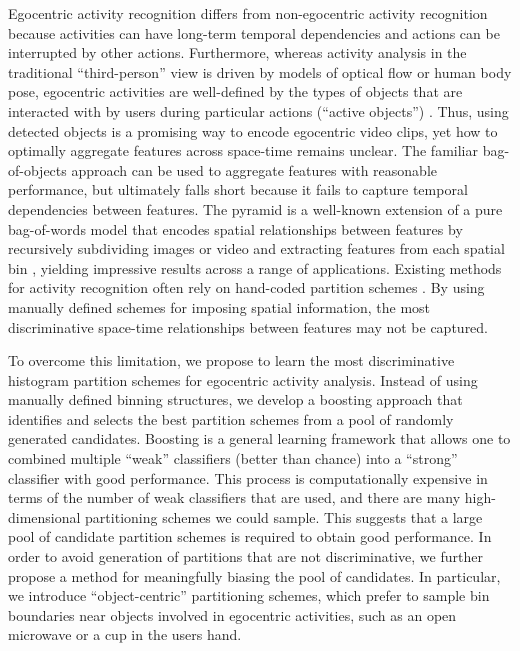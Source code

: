 \documentclass[12pt]{article} %
\begin{document}
   Egocentric activity recognition differs from
  non-egocentric activity recognition because activities can have long-term
  temporal dependencies and actions can be interrupted by other actions. 
  Furthermore, whereas activity analysis in the traditional ``third-person''
  view is driven by models of optical flow or human body pose, egocentric activities
  are well-defined by the types of objects that are interacted with by users
  during particular actions (``active objects'') \cite{Ramanan12}.
  Thus, using detected objects is a promising way to encode egocentric video
  clips, yet how to optimally aggregate
  features across space-time remains unclear.
  The familiar bag-of-objects approach can be used to aggregate 
  features with reasonable performance, but ultimately falls short because it
  fails to capture temporal dependencies between features.
  The pyramid is a well-known extension of a pure bag-of-words model that encodes spatial
  relationships between features by recursively subdividing images or video and extracting 
  features from each spatial bin \cite{Lazebnik06}, yielding impressive
  results across a range of applications.
  Existing methods for activity recognition often rely on
  hand-coded partition schemes \cite{Ramanan12, Choi08, Laptev08}.
  By using manually defined schemes for imposing spatial
  information, the most discriminative space-time relationships between features may not be 
  captured. 







  To overcome this limitation, we propose to learn the most discriminative
  histogram partition schemes for egocentric activity analysis. Instead of
  using manually defined binning structures, we develop a boosting approach
  that identifies and selects the best partition schemes from a pool of
  randomly generated candidates.
  Boosting is a general learning framework that allows one to combined multiple ``weak'' classifiers 
  (better than chance) into a ``strong'' classifier with good performance. 
  This process is computationally expensive in terms of the number of weak
  classifiers that are used, and there are many high-dimensional
  partitioning schemes we could sample. This suggests that a large pool of
  candidate partition schemes is required to obtain good performance.
  In order to avoid generation of partitions that are not discriminative, we
  further propose a method for meaningfully biasing the pool of candidates. 
  In particular, we introduce ``object-centric'' partitioning schemes, which
  prefer to sample bin boundaries near objects involved in egocentric
  activities, such as an open microwave or a cup in the users hand.
  
\end{document}
